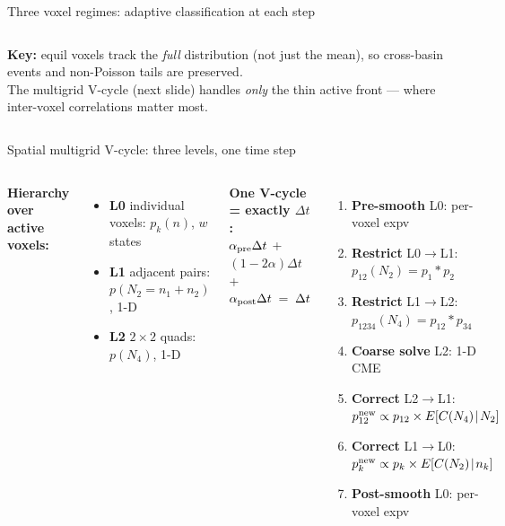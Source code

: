 \documentclass[10pt,aspectratio=169]{beamer}
\begin{document}
\begin{frame}{Three voxel regimes: adaptive classification at each step}
\begin{columns}[T]
\medskip
{\footnotesize
  \textbf{Key:} equil voxels track the \emph{full} distribution (not just the mean),
  so cross-basin events and non-Poisson tails are preserved.\\[0.4em]
  The multigrid V-cycle (next slide) handles \emph{only} the thin active front ---
  where inter-voxel correlations matter most.
}
\end{columns}

\end{frame}


\begin{frame}{Spatial multigrid V-cycle: three levels, one time step}

\begin{columns}[T]

\textbf{Hierarchy over active voxels:}
\begin{itemize}\setlength\itemsep{0.25em}
  \item \textbf{L0} individual voxels: $p_k(n)$, $w$ states
  \item \textbf{L1} adjacent pairs: $p(N_2{=}n_1{+}n_2)$, 1-D
  \item \textbf{L2} $2{\times}2$ quads: $p(N_4)$, 1-D \quad[coarsest]
\end{itemize}

\medskip
\textbf{One V-cycle = exactly $\Delta t$:}\\[0.3em]
{\small $\alpha_{\rm pre}\Delta t$ \;+\; $(1{-}2\alpha)\Delta t$ \;+\; $\alpha_{\rm post}\Delta t \;=\; \Delta t$}

\medskip
\begin{enumerate}\setlength\itemsep{0.22em}
  \item \textbf{Pre-smooth} L0: per-voxel expv 
  \item \textbf{Restrict} L0$\to$L1: $p_{12}(N_2) = p_1 * p_2$
  \item \textbf{Restrict} L1$\to$L2: $p_{1234}(N_4) = p_{12} * p_{34}$
  \item \textbf{Coarse solve} L2: 1-D CME 
  \item \textbf{Correct} L2$\to$L1: $p_{12}^{\rm new} \propto p_{12}\times E[C(N_4)\!\mid\!N_2]$
  \item \textbf{Correct} L1$\to$L0: $p_k^{\rm new} \propto p_k\times E[C(N_2)\!\mid\!n_k]$
  \item \textbf{Post-smooth} L0: per-voxel expv 
\end{enumerate}


\end{columns}
\end{frame}
\end{document}
